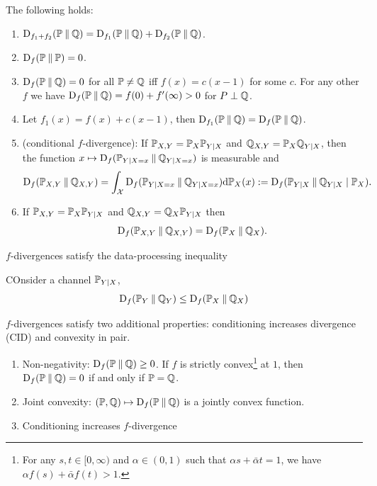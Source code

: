 \begin{proposition}
    The following holds:
    \begin{enumerate}[label=(\roman*)]
        \item $\operatorname{D}_{f_1+f_2}(\mathbb{P}\mathbin{\|}\mathbb{Q})=\operatorname{D}_{f_1}(\mathbb{P}\mathbin{\|}\mathbb{Q})+\operatorname{D}_{f_2}(\mathbb{P}\mathbin{\|}\mathbb{Q})$.
        \item $\operatorname{D}_f(\mathbb{P}\mathbin{\|}\mathbb{P})=0$.
        \item $\operatorname{D}_f(\mathbb{P}\mathbin{\|}\mathbb{Q})=0$ for all $\mathbb{P}\neq\mathbb{Q}$ iff $f(x)=c(x-1)$ for some $c$. For any other $f$ we have $\operatorname{D}_f(\mathbb{P}\mathbin{\|}\mathbb{Q})=f(0)+f'(\infty)>0$ for $P\perp\mathbb{Q}$.
        \item Let $f_1(x)=f(x)+c(x-1)$, then $\operatorname{D}_{f_1}(\mathbb{P}\mathbin{\|}\mathbb{Q})=\operatorname{D}_f(\mathbb{P}\mathbin{\|}\mathbb{Q})$.
        \item \textnormal{(conditional $f$-divergence)}: If $\mathbb{P}_{X,Y}=\mathbb{P}_X\mathbb{P}_{Y|X}$ and $\mathbb{Q}_{X,Y}=\mathbb{P}_X\mathbb{Q}_{Y|X}$, then the function $x\mapsto \operatorname{D}_f(\mathbb{P}_{Y|X=x}\mathbin{\|}\mathbb{Q}_{Y|X=x})$ is measurable and \[\operatorname{D}_f(\mathbb{P}_{X,Y}\mathbin{\|}\mathbb{Q}_{X,Y})=\int_{\mathcal{X}}\operatorname{D}_f(\mathbb{P}_{Y|X=x}\mathbin{\|}\mathbb{Q}_{Y|X=x})\mathrm{d}\mathbb{P}_X(x):=\operatorname{D}_f(\mathbb{P}_{Y|X}\mathbin{\|}\mathbb{Q}_{Y|X}\mid\mathbb{P}_X).\]
        \item If $\mathbb{P}_{X,Y}=\mathbb{P}_X\mathbb{P}_{Y|X}$ and $\mathbb{Q}_{X,Y}=\mathbb{Q}_X\mathbb{P}_{Y|X}$ then \[\operatorname{D}_f(\mathbb{P}_{X,Y}\mathbin{\|}\mathbb{Q}_{X,Y})=\operatorname{D}_f(\mathbb{P}_X\mathbin{\|}\mathbb{Q}_X).\]
    \end{enumerate}
\end{proposition}

\begin{theorem}
    
\end{theorem}

$f$-divergences satisfy the data-processing inequality
\begin{theorem}
    COnsider a channel $\mathbb{P}_{Y|X}$,
    \[\operatorname{D}_f(\mathbb{P}_Y\mathbin{\|}\mathbb{Q}_Y)\leq \operatorname{D}_f(\mathbb{P}_X\mathbin{\|}\mathbb{Q}_X)\]
\end{theorem}

$f$-divergences satisfy two additional properties: conditioning increases divergence (CID) and convexity in pair.
\begin{theorem}
    \begin{enumerate}[label=(\roman*)]
        \item \textnormal{Non-negativity}: $\operatorname{D}_f(\mathbb{P}\mathbin{\|}\mathbb{Q})\geq 0$. If $f$ is strictly convex\footnote{For any $s,t\in[0,\infty)$ and $\alpha\in(0,1)$ such that $\alpha s+\bar{\alpha}t=1$, we have $\alpha f(s)+\bar{\alpha}f(t)>1$.} at $1$, then $\operatorname{D}_f(\mathbb{P}\mathbin{\|}\mathbb{Q})=0$ if and only if $\mathbb{P}=\mathbb{Q}$.
        \item \textnormal{Joint convexity}: $(\mathbb{P},\mathbb{Q})\mapsto\operatorname{D}_f(\mathbb{P}\mathbin{\|}\mathbb{Q})$ is a jointly convex function.
        \item \textnormal{Conditioning increases $f$-divergence}
    \end{enumerate}
\end{theorem}

